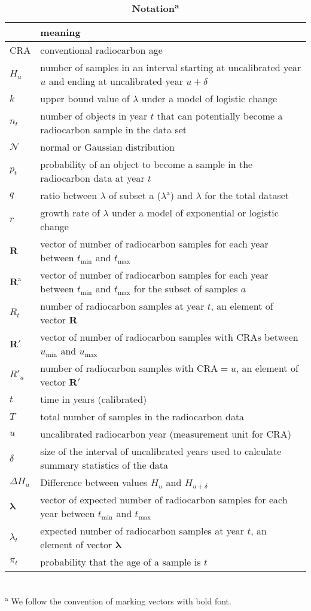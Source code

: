 \documentclass[a4paper]{article}
\begin{document}
\begin{table}[h]
\caption{\textbf{Notation\textsuperscript{a}}}
\label{tab:notation}
\small
\begin{tabularx}{\textwidth}{lX}
\hline
& meaning \\
\hline\hline
CRA & conventional radiocarbon age\\
$H_{u}$ & number of samples in an interval starting at uncalibrated year $u$ and ending at uncalibrated year $u+\delta$\\
$k$ & upper bound value of $\lambda$ under a model of logistic change\\
$n_t$ & number of objects in year $t$ that can potentially become a radiocarbon sample in the data set\\
$\mathcal{N}$ & normal or Gaussian distribution\\
$p_t$ & probability of an object to become a sample in the radiocarbon data at year $t$\\
$q$ & ratio between $\lambda$ of subset $\mathrm{a}$ ($\lambda^\mathrm{a}$) and $\lambda$ for the total dataset\\
$r$ & growth rate of $\lambda$ under a model of exponential or logistic change\\
$\bm{R}$ & vector of number of radiocarbon samples for each year between $t_\mathrm{min}$ and $t_\mathrm{max}$\\
$\bm{R}^{\mathrm{a}}$ & vector of number of radiocarbon samples for each year between $t_\mathrm{min}$ and $t_\mathrm{max}$ for the subset of samples $a$\\
$R_t$ & number of radiocarbon samples at year $t$, an element of vector $\bm{R}$\\
$\bm{R'}$ & vector of number of radiocarbon samples with CRAs between $u_\mathrm{min}$ and $u_\mathrm{max}$\\
$R'_u$ & number of radiocarbon samples with CRA$=u$, an element of vector $\bm{R'}$\\
$t$ & time in years (calibrated)\\
$T$ & total number of samples in the radiocarbon data\\
$u$ & uncalibrated radiocarbon year (measurement unit for CRA)\\
$\delta$ & size of the interval of uncalibrated years used to calculate summary statistics of the data\\
$\Delta H_{u}$ & Difference between values $H_{u}$ and $H_{u+\delta}$\\
$\bm{\lambda}$ & vector of expected number of radiocarbon samples for each year between $t_\mathrm{min}$ and $t_\mathrm{max}$\\
$\lambda_t$ & expected number of radiocarbon samples at year $t$, an element of vector $\bm{\lambda}$\\
$\pi_t$ & probability that the age of a sample is $t$\\
\hline
\end{tabularx}\\
\footnotesize{\textsuperscript{a} We follow the convention of marking vectors with bold font.}\\\end{table}
\end{document}
